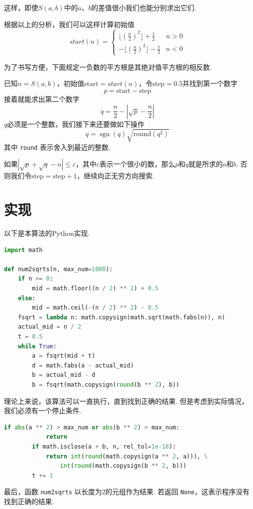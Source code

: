 \documentclass[a4paper, UTF8]{ctexart}
\DeclareMathOperator{\sgn}{\mathrm{sgn}}
\begin{document}
这样，即使$S(a,b)$中的$a$、$b$的差值很小我们也能分别求出它们.

根据以上的分析，我们可以这样计算初始值
\[
    start(n)=
    \begin{cases}
        \lfloor(\frac{n}{2})^2\rfloor+\frac{1}{2}  &n>0 \\
        -\lfloor(\frac{n}{2})^2\rfloor-\frac{1}{2} &n<0
    \end{cases}
\]

为了书写方便，下面规定一负数的平方根是其绝对值平方根的相反数.

已知$n=S(a,b)$，初始值$\text{start}=start(n)$，令$\text{step}=0.5$并找到第一个数字\[p=\text{start}-\text{step}\]接着就能求出第二个数字\[q=\frac{n}{2}-|\sqrt{p}-\frac{n}{2}|\]$q$必须是一个整数，我们接下来还要做如下操作\[q=\sgn(q)\sqrt{\mathrm{round}(q^2)}\]其中 \verb|round| 表示舍入到最近的整数.

如果$|\sqrt{p}+\sqrt{q}-n|\leq\varepsilon$，其中$\varepsilon$表示一个很小的数，那么$p$和$q$就是所求的$a$和$b$. 否则我们令$\text{step}=\text{step}+1$，继续向正无穷方向搜索.

\section{实现}
以下是本算法的Python实现.

\begin{lstlisting}[language=python, name=example1]
import math

def num2sqrts(n, max_num=1000):
    if n >= 0:
        mid = math.floor((n / 2) ** 2) + 0.5
    else:
        mid = math.ceil(-(n / 2) ** 2) - 0.5
    fsqrt = lambda n: math.copysign(math.sqrt(math.fabs(n)), n)
    actual_mid = n / 2
    t = 0.5
    while True:
        a = fsqrt(mid + t)
        d = math.fabs(a - actual_mid)
        b = actual_mid - d
        b = fsqrt(math.copysign(round(b ** 2), b))
\end{lstlisting}
理论上来说，该算法可以一直执行，直到找到正确的结果. 但是考虑到实际情况，我们必须有一个停止条件.
\begin{lstlisting}[language=python, name=example1]
        if abs(a ** 2) > max_num or abs(b ** 2) > max_num:
            return
        if math.isclose(a + b, n, rel_tol=1e-16):
            return int(round(math.copysign(a ** 2, a))), \
                int(round(math.copysign(b ** 2, b)))
        t += 1
\end{lstlisting}
最后，函数 \verb|num2sqrts| 以长度为2的元组作为结果. 若返回 \verb|None|，这表示程序没有找到正确的结果.
\end{document}
